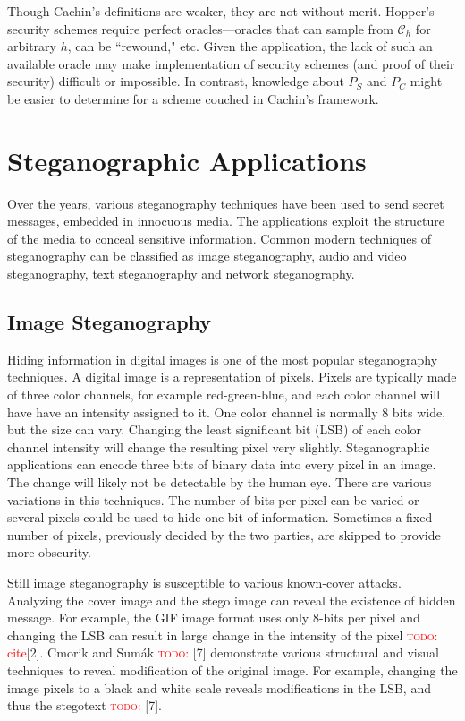 \documentclass[11pt]{article}
\newcommand\todo[1]{\textcolor{red}{\textsc{todo}: #1}}
\newcommand\channel{\ensuremath{\mathcal C}}
\begin{document}
Though Cachin's definitions are weaker, they are not without merit.
Hopper's security schemes require perfect oracles---oracles that can
sample from $\channel_h$ for arbitrary $h$, can be ``rewound," etc.
Given the application, the lack of such an available oracle may make
implementation of security schemes (and proof of their security)
difficult or impossible. In contrast, knowledge about $P_S$ and
$P_C$ might be easier to determine for a scheme couched in Cachin's
framework.

\section{Steganographic Applications}
Over the years, various steganography techniques have been used to
send secret messages, embedded in innocuous media. The applications
exploit the structure of the media to conceal sensitive information.
Common modern techniques of steganography can be classified as image
steganography, audio and video steganography, text steganography and
network steganography.

\subsection{Image Steganography}
Hiding information in digital images is one of the most popular
steganography techniques. A digital image is a representation of
pixels. Pixels are typically made of three color channels, for example
red-green-blue, and each color channel will have have an intensity
assigned to it. One color channel is normally 8 bits wide, but the
size can vary. Changing the least significant bit (LSB) of each color
channel intensity will change the resulting pixel very slightly.
Steganographic applications can encode three bits of binary data into
every pixel in an image. The change will likely not be detectable by
the human eye. There are various variations in this techniques. The
number of bits per pixel can be varied or several pixels could be used
to hide one bit of information. Sometimes a fixed number of pixels,
previously decided by the two parties, are skipped to provide more
obscurity.

Still image steganography is susceptible to various known-cover
attacks. Analyzing the cover image and the stego image can reveal the
existence of hidden message. For example, the GIF image format uses
only 8-bits per pixel and changing the LSB can result in large change
in the intensity of the pixel \todo{cite}[2]. Cmorik and Sum\'ak \todo{}
[7] demonstrate various structural and visual techniques to reveal
modification of the original image. For example, changing the image
pixels to a black and white scale reveals modifications in the LSB,
and thus the stegotext \todo{} [7].
\end{document}
